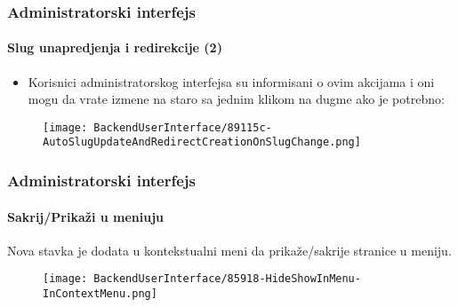 
\begin{frame}[fragile]
	\frametitle{Administratorski interfejs}
	\framesubtitle{Slug unapredjenja i redirekcije (2)}

	\begin{itemize}
		\item Korisnici administratorskog interfejsa su informisani o ovim akcijama
			i oni mogu da vrate izmene na staro sa jednim klikom na dugme ako je potrebno:

	\end{itemize}

	\begin{figure}
		\texttt{[image: BackendUserInterface/89115c-AutoSlugUpdateAndRedirectCreationOnSlugChange.png]}
	\end{figure}

\end{frame}


\begin{frame}[fragile]
	\frametitle{Administratorski interfejs}
	\framesubtitle{Sakrij/Prikaži u meniuju}

	Nova stavka je dodata u kontekstualni meni da prikaže/sakrije stranice u meniju.

	\begin{figure}
		\texttt{[image: BackendUserInterface/85918-HideShowInMenu-InContextMenu.png]}
	\end{figure}

\end{frame}

